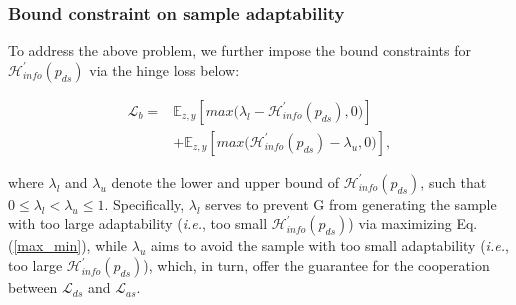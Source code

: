 \subsubsection{Bound constraint on sample adaptability}
\label{boundary_constraint}
To address the above problem, we further impose the bound constraints for $\mathcal{H}^{'}_{info}(p_{ds})$ via the hinge loss \cite{lim2017geometric} below:
\begin{small}
\begin{equation}
\begin{aligned}
\mathcal{L}_b=&\mathbb{E}_{z,y}[max\big(\lambda_l-\mathcal{H}_{info}^{'}(p_{ds}),0\big)] \\
&+ \mathbb{E}_{z,y}[max\big(\mathcal{H}_{info}^{'}(p_{ds})-\lambda_u,0\big)],
\label{boundary_loss}
\end{aligned}
\end{equation}
\end{small}
where $\lambda_l$ and $\lambda_u$ denote the lower and upper bound of $\mathcal{H}^{'}_{info}(p_{ds})$, such that $0 \le \lambda_l < \lambda_u \le 1$. 
Specifically, $\lambda_l$ serves to prevent G from generating the sample with too large adaptability (\emph{i.e.}, too small $\mathcal{H}^{'}_{info}(p_{ds})$) via maximizing Eq.(\ref{max_min}), while $\lambda_u$ aims to avoid the sample with too small adaptability (\emph{i.e.}, too large $\mathcal{H}^{'}_{info}(p_{ds})$), which, in turn, offer the guarantee for the cooperation between $\mathcal{L}_{ds}$ and $\mathcal{L}_{as}$. 
